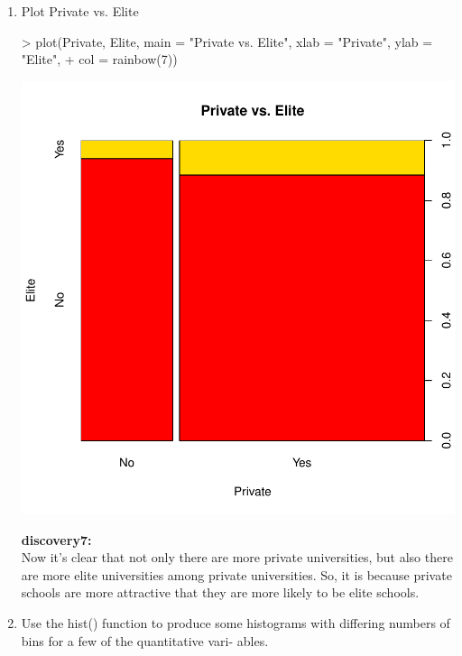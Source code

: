 \documentclass[a4paper]{article}
\begin{document}
\begin{enumerate}
\item Plot Private vs. Elite
\begin{Schunk}
\begin{Sinput}
> plot(Private, Elite, main = "Private vs. Elite", xlab = "Private", ylab = "Elite",
+      col = rainbow(7))
\end{Sinput}
\end{Schunk}
\includegraphics{introduction-Private-Elite}

{
\colorbox{BurntOrange}{\textbf{discovery7:}}\color{red}\\
Now it's clear that not only there are more private universities, but also there are more elite universities among private universities. So, it is because private schools are more attractive that they are more likely to be elite schools.
}


\item Use the hist() function to produce some histograms with differing numbers of bins for a few of the quantitative vari- ables.


\end{enumerate}
\end{document}
